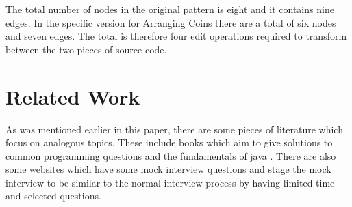 \documentclass[10pt,twocolumn]{IEEEtran}
\begin{document}
\par The total number of nodes in the original pattern is eight and it contains nine edges. In the specific version for Arranging Coins there are a total of six nodes and seven edges. The total is therefore four edit operations required to transform between the two pieces of source code. 
\section{Related Work}
As was mentioned earlier in this paper, there are some pieces of literature which focus on analogous topics. These include books which aim to give solutions to common programming questions \cite{mcdowell2015cracking} and the fundamentals of java \cite{markham2014java}\cite{aziz2012elements}. There are also some websites which have some mock interview questions and stage the mock interview to be similar to the normal interview process by having limited time and selected questions.
\end{document}
